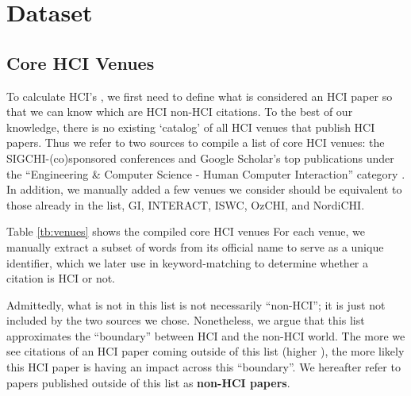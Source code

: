 \section{Dataset}

\subsection{Core HCI Venues}
% 
To calculate HCI's \xin, we first need to define what is considered an HCI paper so that we can know which are HCI \vs non-HCI citations.
To the best of our knowledge, there is no existing `catalog' of all HCI venues that publish HCI papers.
Thus we refer to two sources to compile a list of core HCI venues: the SIGCHI-(co)sponsored conferences \cite{Upcoming19:online} and Google Scholar's top publications under the ``Engineering \& Computer Science - Human Computer Interaction'' category \cite{HumanCom38:online}.
In addition, we manually added a few venues we consider should be equivalent to those already in the list, \eg GI, INTERACT, ISWC, OzCHI, and NordiCHI.

Table \ref{tb:venues} shows the compiled core HCI venues
For each venue, we manually extract a subset of words from its official name to serve as a unique identifier, which we later use in keyword-matching to determine whether a citation is HCI or not.

Admittedly, what is not in this list is not necessarily ``non-HCI''; it is just not included by the two sources we chose.
Nonetheless, we argue that this list approximates the ``boundary'' between HCI and the non-HCI world.
The more we see citations of an HCI paper coming outside of this list (\ie higher \xin), the more likely this HCI paper is having an impact across this ``boundary''.
We hereafter refer to papers published outside of this list as {\bf non-HCI papers}.

